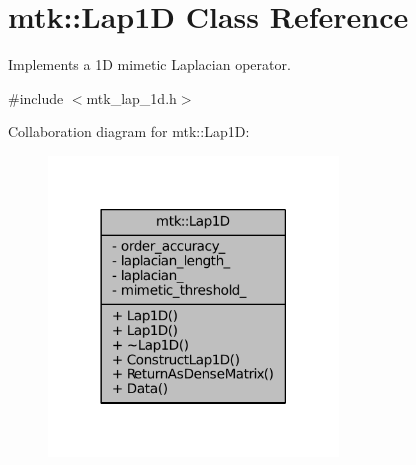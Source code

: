 \hypertarget{classmtk_1_1Lap1D}{\section{mtk\-:\-:Lap1\-D Class Reference}
\label{classmtk_1_1Lap1D}
}


Implements a 1\-D mimetic Laplacian operator.  




{\ttfamily \#include $<$mtk\-\_\-lap\-\_\-1d.\-h$>$}



Collaboration diagram for mtk\-:\-:Lap1\-D\-:
\nopagebreak
\begin{figure}[H]
\begin{center}
\leavevmode
\includegraphics[width=218pt]{classmtk_1_1Lap1D__coll__graph}
\end{center}
\end{figure}
